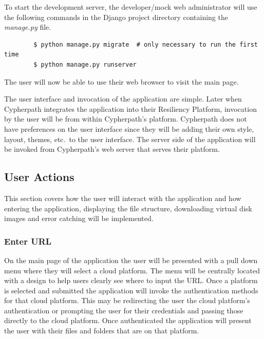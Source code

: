 \documentclass{article}
\begin{document}
        To start the development server, the developer/mock web administrator will use the following commands in the Django project directory containing the \textit{manage.py} file.
        \begin{verbatim}
        $ python manage.py migrate  # only necessary to run the first time
        $ python manage.py runserver
        \end{verbatim}

        The user will now be able to use their web browser to visit the main page.

        The user interface and invocation of the application are simple. Later when Cypherpath integrates the application into their Resiliency Platform, invocation by the user will be from within Cypherpath's
        platform. Cypherpath does not have preferences on the user interface since they will be adding their own style, layout, themes, etc.\ to the user interface. The server side of the application will be invoked
        from Cypherpath's web server that serves their platform.

        \subsection{User Actions}
        This section covers how the user will interact with the application and how entering the application, displaying the file structure, downloading virtual disk images and error catching 
        will be implemented.

            \subsubsection{Enter URL}
            On the main page of the application the user will be presented with a pull down menu where they will select a cloud platform. The menu will be centrally located with a design to
            help users clearly see where to input the URL. Once a platform is selected and submitted the application will invoke the authentication methods for that cloud platform. This may be redirecting the user
            the cloud platform's authentication or prompting the user for their credentials and passing those directly to the cloud platform.
            Once authenticated the application will present the user with their files and folders that are on that platform.
            
\end{document}
